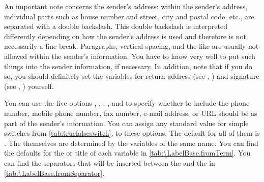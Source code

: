 An important note concerns the sender's address: within
the sender's address, individual parts such as house number and street, city
and postal code, etc., are separated with a double backslash. This double
backslash is interpreted differently depending on how the sender's address is
used and therefore is not necessarily a line break. Paragraphs, vertical
spacing, and the like are usually not allowed within the sender's information.
You have to know \KOMAScript{} very well to put such things into the sender
information, if necessary. In addition, note that if you do so, you should
definitely set the variables for return address (see
,
) and signature (see
,
) yourself.%
%
\EndIndexGroup

\begin{Declaration}
\end{Declaration}
%
%
You can use the five options ,
, ,
, and  to specify whether to include the
phone number,
mobile phone number, fax number, e-mail
address, or URL should be as part of the sender's
information. You can assign any standard value for simple switches from
\autoref{tab:truefalseswitch},  to these
options. The default for all of them is . The 
themselves are determined by the variables of the same name. You can find the
defaults for the  or title of each variable in
\autoref{tab:\LabelBase.fromTerm}. You can find the separators that will be
inserted between the  and the  in
\autoref{tab:\LabelBase.fromSeparator}.

